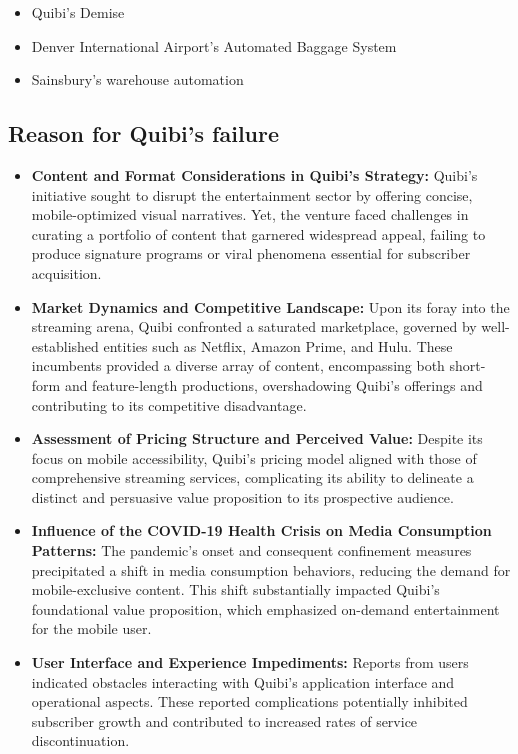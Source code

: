 \documentclass[12pt,a4paper]{article}
\begin{document}
\begin{itemize}
    \item Quibi’s Demise
    \item Denver International Airport’s Automated Baggage System
    \item Sainsbury’s warehouse automation
\end{itemize}

\subsection{Reason for Quibi’s failure}
\label{sec:Question 3}
\nocite{question_3.2}

\begin{itemize}
    \item \textbf{Content and Format Considerations in Quibi's Strategy: }Quibi's initiative sought to disrupt the entertainment sector by offering concise, mobile-optimized visual narratives. Yet, the venture faced challenges in curating a portfolio of content that garnered widespread appeal, failing to produce signature programs or viral phenomena essential for subscriber acquisition.
    
   \item \textbf{Market Dynamics and Competitive Landscape: }Upon its foray into the streaming arena, Quibi confronted a saturated marketplace, governed by well-established entities such as Netflix, Amazon Prime, and Hulu. These incumbents provided a diverse array of content, encompassing both short-form and feature-length productions, overshadowing Quibi's offerings and contributing to its competitive disadvantage.
    
   \item \textbf{Assessment of Pricing Structure and Perceived Value: }Despite its focus on mobile accessibility, Quibi's pricing model aligned with those of comprehensive streaming services, complicating its ability to delineate a distinct and persuasive value proposition to its prospective audience.

    \item \textbf{Influence of the COVID-19 Health Crisis on Media Consumption Patterns: }The pandemic's onset and consequent confinement measures precipitated a shift in media consumption behaviors, reducing the demand for mobile-exclusive content. This shift substantially impacted Quibi's foundational value proposition, which emphasized on-demand entertainment for the mobile user.

    \item \textbf{User Interface and Experience Impediments: }Reports from users indicated obstacles interacting with Quibi's application interface and operational aspects. These reported complications potentially inhibited subscriber growth and contributed to increased rates of service discontinuation.

    \end{itemize}
    
\end{document}

